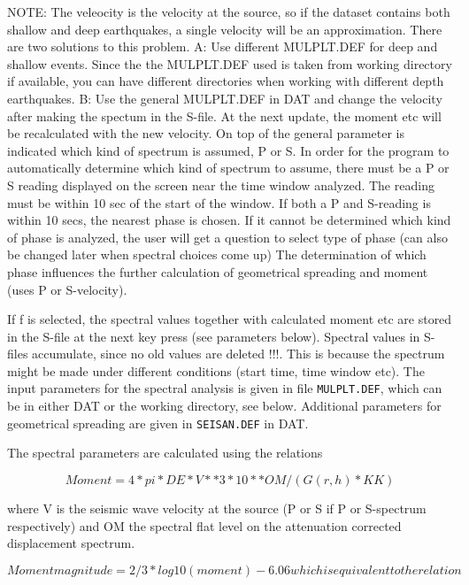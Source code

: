 NOTE: The veleocity is the velocity at the source, so if the dataset contains both shallow and deep earthquakes, a single velocity will be an approximation. There are two solutions to this problem. A: Use different MULPLT.DEF for deep and shallow events. Since the the MULPLT.DEF used is taken from working directory if available, you can have different directories when working with different depth earthquakes. B: Use the general MULPLT.DEF in DAT and change the velocity after making the spectum in the S-file. At the next update, the moment etc will be recalculated with the new velocity.
On top of the general parameter is indicated which kind of spectrum  is assumed, P or S. In order for the program to automatically determine which kind of spectrum to assume, there must be a P or S reading displayed on the screen near the time window analyzed.  The reading must be within 10 sec of the start of the window. If both a P and S-reading is within 10 secs, the nearest phase is chosen. If it cannot be determined which kind of phase is analyzed, the user will get a question to select type of phase (can also be changed later when spectral choices come up) The determination of which phase influences the further calculation of geometrical spreading and moment (uses P or S-velocity). 

If f is selected, the spectral values together with calculated moment etc are stored in the S-file at the next key press (see parameters below). Spectral values in S-files accumulate, since no old values are deleted !!!. This is because the spectrum might be made under different conditions (start time, time window etc). The input parameters for the spectral analysis is given in file \texttt{MULPLT.DEF}, which can be in either DAT or the working directory, see below. Additional parameters for geometrical spreading are given in \texttt{SEISAN.DEF} in DAT. 

The spectral parameters are calculated using the relations 

\begin{displaymath}
Moment = 4 * pi * DE * V**3 * 10**OM /( G(r,h) * KK) 
\end{displaymath}

where V is the seismic wave velocity at the source (P or S if P or S-spectrum respectively) and OM the spectral flat level on the attenuation corrected displacement spectrum. 

\begin{displaymath}
Moment magnitude = 2/3 * log10(moment) - 6.06  which is equivalent to the relation 
\end{displaymath}

